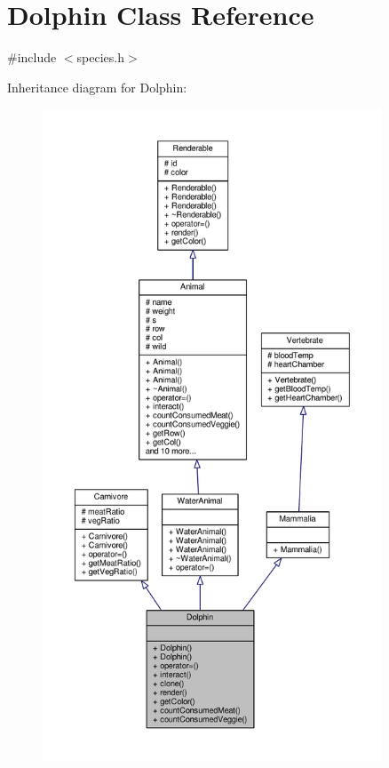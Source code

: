 \hypertarget{classDolphin}{}\section{Dolphin Class Reference}
\label{classDolphin}


{\ttfamily \#include $<$species.\+h$>$}



Inheritance diagram for Dolphin\+:
\nopagebreak
\begin{figure}[H]
\begin{center}
\leavevmode
\includegraphics[height=550pt]{classDolphin__inherit__graph}
\end{center}
\end{figure}


